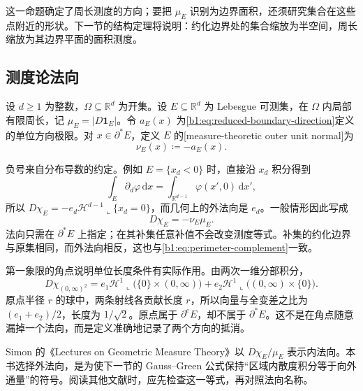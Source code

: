 这一命题确定了周长测度的方向；要把 \(\mu_E\) 识别为边界面积，还须研究集合在这些点附近的形状。下一节的结构定理将说明：约化边界处的集合缩放为半空间，周长缩放为其边界平面的面积测度。

\subsection{测度论法向}
\label{b1:subsec:270405}

\begin{definition}\label{b1:def:measure-theoretic-outer-normal}
设 \(d\ge1\) 为整数，\(\Omega\subseteq\mathbb R^d\) 为开集。设 \(E\subseteq\mathbb R^d\) 为 Lebesgue 可测集，在 \(\Omega\) 内局部有限周长，记 \(\mu_E=|D\mathbf1_E|\)。令 \(a_E(x)\) 为\eqref{b1:eq:reduced-boundary-direction}定义的单位方向极限。对 \(x\in\partial^*E\)，定义 \(E\) 的[measure-theoretic outer unit normal]为
\[
 \nu_E(x)\coloneqq-a_E(x).
\]
\end{definition}

负号来自分布导数的约定。例如 \(E=\{x_d<0\}\) 时，直接沿 \(x_d\) 积分得到
\[
 \int_E\partial_d\varphi\,\mathrm dx
 =\int_{\mathbb R^{d-1}}\varphi(x',0)\,\mathrm dx',
\]
所以 \(D\chi_E=-e_d\mathcal H^{d-1}\llcorner\{x_d=0\}\)，而几何上的外法向是 \(e_d\)。一般情形因此写成
\[
 D\chi_E=-\nu_E\mu_E.
\]
法向只需在 \(\partial^*E\) 上指定；在其补集任意补值不会改变测度等式。补集的约化边界与原集相同，而外法向相反，这也与\eqref{b1:eq:perimeter-complement}一致。

\ProseParagraphBreak

第一象限的角点说明单位长度条件有实际作用。由两次一维分部积分，
\[
 D\chi_{(0,\infty)^2}
 =e_1\mathcal H^1\llcorner\bigl(\{0\}\times(0,\infty)\bigr)
 +e_2\mathcal H^1\llcorner\bigl((0,\infty)\times\{0\}\bigr).
\]
原点半径 \(r\) 的球中，两条射线各贡献长度 \(r\)，所以向量与全变差之比为 \((e_1+e_2)/2\)，长度为 \(1/\sqrt2\)。原点属于 \(\partial^eE\)，却不属于 \(\partial^*E\)。这不是在角点随意漏掉一个法向，而是定义准确地记录了两个方向的抵消。

\ProseParagraphBreak

Simon 的《Lectures on Geometric Measure Theory》以 \(D\chi_E/\mu_E\) 表示内法向\cite[\S14, 14.1--14.2]{Simon1983Lectures}。本书选择外法向，是为使下一节的 Gauss–Green 公式保持“区域内散度积分等于向外通量”的符号。阅读其他文献时，应先检查这一等式，再对照法向名称。
